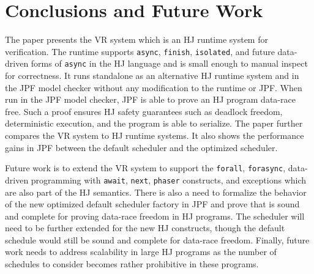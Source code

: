 \section{Conclusions and Future Work}
The paper presents the VR system which is an HJ runtime system for
verification. The runtime supports \texttt{async}, \texttt{finish},
\texttt{isolated}, and future data-driven forms of \texttt{async} in
the HJ language and is small enough to manual inspect for
correctness. It runs standalone as an alternative HJ runtime system
and in the JPF model checker without any modification to the runtime or JPF. When run in the JPF model checker, JPF
is able to prove an HJ program data-race free. Such a proof ensures HJ
safety guarantees such as deadlock freedom, deterministic execution,
and the program is able to serialize. The paper further compares the
VR system to HJ runtime systems. It also shows the performance gains
in JPF between the default scheduler and the optimized scheduler.

Future work is to extend the VR system to support the \texttt{forall}, \texttt{forasync}, data-driven programming with \texttt{await}, \texttt{next}, \texttt{phaser} constructs, and exceptions which are
also part of the HJ semantics. There is also a need to formalize the
behavior of the new optimized default scheduler factory in JPF and
prove that is sound and complete for proving data-race freedom in HJ
programs. The scheduler will need to be further extended for the new
HJ constructs, though the default schedule would still be sound and
complete for data-race freedom. Finally, future work needs to address
scalability in large HJ programs as the number of schedules to
consider becomes rather prohibitive in these programs.
